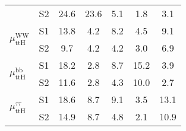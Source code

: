 \begin{tabular}{@{} l c c@{\hskip 0.15in} c c c c @{}}
                        & S2  & 24.6& 23.6 & 5.1 & 1.8 & 3.1  \\[4pt]
\multirow{2}{*}{$\mu_{\mathrm{ttH}}^{\mathrm{WW}}$} & S1  & 13.8& 4.2 & 8.2 & 4.5 & 9.1  \\[1pt]
                        & S2  & 9.7& 4.2 & 4.2 & 3.0 & 6.9  \\[4pt]
\multirow{2}{*}{$\mu_{\mathrm{ttH}}^{\mathrm{bb}}$} & S1  & 18.2& 2.8 & 8.7 & 15.2 & 3.9  \\[1pt]
                        & S2  & 11.6& 2.8 & 4.3 & 10.0 & 2.7  \\[4pt]
\multirow{2}{*}{$\mu_{\mathrm{ttH}}^{\tau \tau }$} & S1  & 18.6& 8.7 & 9.1 & 3.5 & 13.1  \\[1pt]
                        & S2  & 14.9& 8.7 & 4.8 & 2.1 & 10.9  \\[4pt]
\hline
\end{tabular}